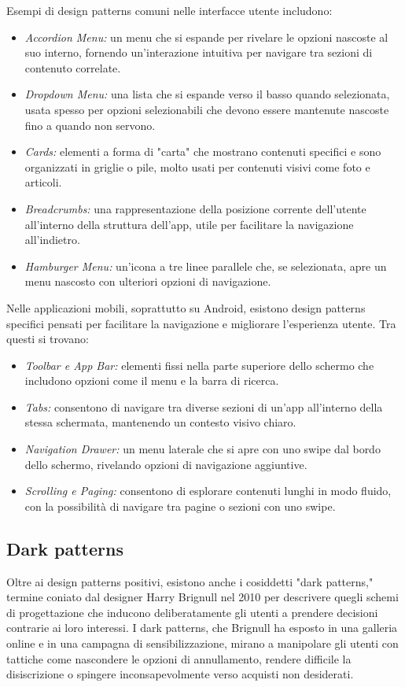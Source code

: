 Esempi di design patterns comuni nelle interfacce utente includono:
\begin{itemize}
    \item \textit{Accordion Menu:} un menu che si espande per rivelare le opzioni nascoste al suo interno, fornendo un’interazione intuitiva per navigare tra sezioni di contenuto correlate.
    \item \textit{Dropdown Menu:} una lista che si espande verso il basso quando selezionata, usata spesso per opzioni selezionabili che devono essere mantenute nascoste fino a quando non servono.
    \item \textit{Cards:} elementi a forma di "carta" che mostrano contenuti specifici e sono organizzati in griglie o pile, molto usati per contenuti visivi come foto e articoli.
    \item \textit{Breadcrumbs:} una rappresentazione della posizione corrente dell’utente all’interno della struttura dell’app, utile per facilitare la navigazione all’indietro.
    \item \textit{Hamburger Menu:} un’icona a tre linee parallele che, se selezionata, apre un menu nascosto con ulteriori opzioni di navigazione.
\end{itemize}
Nelle applicazioni mobili, soprattutto su Android, esistono design patterns specifici pensati per facilitare la navigazione e migliorare l’esperienza utente. Tra questi si trovano:
\begin{itemize}
    \item \textit{Toolbar e App Bar:} elementi fissi nella parte superiore dello schermo che includono opzioni come il menu e la barra di ricerca.
    \item \textit{Tabs:} consentono di navigare tra diverse sezioni di un’app all'interno della stessa schermata, mantenendo un contesto visivo chiaro.
    \item \textit{Navigation Drawer:} un menu laterale che si apre con uno swipe dal bordo dello schermo, rivelando opzioni di navigazione aggiuntive.
    \item \textit{Scrolling e Paging:} consentono di esplorare contenuti lunghi in modo fluido, con la possibilità di navigare tra pagine o sezioni con uno swipe.
\end{itemize}

\subsection{Dark patterns}
Oltre ai design patterns positivi, esistono anche i cosiddetti "dark patterns," termine coniato dal designer Harry Brignull nel 2010 per descrivere quegli schemi di progettazione che inducono deliberatamente gli utenti a prendere decisioni contrarie ai loro interessi. I dark patterns, che Brignull ha esposto in una galleria online e in una campagna di sensibilizzazione, mirano a manipolare gli utenti con tattiche come nascondere le opzioni di annullamento, rendere difficile la disiscrizione o spingere inconsapevolmente verso acquisti non desiderati.

